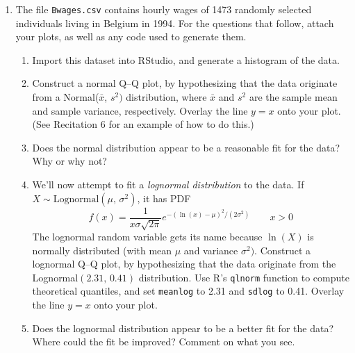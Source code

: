 \documentclass{article}    %
\begin{document}
\begin{enumerate}
		\item The file \texttt{Bwages.csv} contains hourly wages of 1473 randomly selected individuals living in Belgium in 1994. For the questions that follow, attach your plots, as well as any code used to generate them.
		
		\begin{enumerate}
			\item Import this dataset into RStudio, and generate a histogram of the data. 
			
			\item  Construct a normal Q--Q plot, by hypothesizing
			that the data originate from a Normal($\bar x$, $s^2)$ distribution,
			where $\bar x$ and $s^2$ are the sample mean and sample variance,
			respectively. Overlay the line $y=x$ onto your plot.  (See
			Recitation 6 for an example of how to do this.) 		
			
			\item Does the normal distribution appear to be a reasonable fit for the data? Why or why not? 
			

			\item  We'll now attempt to fit a \textit{lognormal distribution} to the data. If $X \sim \text{Lognormal}(\mu, \, \sigma^2)$, it has PDF
			$$
			f(x) =\frac{1}{x\sigma\sqrt{2\pi}}e^{-(\ln(x) - \mu)^2/(2\sigma^2)} \qquad x > 0
			$$
			The lognormal random variable gets its name because $\ln(X)$ is normally distributed (with mean $\mu$ and variance $\sigma^2)$. Construct a lognormal Q--Q plot, by hypothesizing that the data originate from the Lognormal$(2.31, \, 0.41)$ distribution. Use R's \texttt{qlnorm} function to compute theoretical quantiles, and set \texttt{meanlog} to 2.31 and \texttt{sdlog} to 0.41. Overlay the line $y=x$ onto your plot.
			
			\item Does the lognormal distribution appear to be a better fit for the data? Where could the fit be improved? Comment on what you see. 
			
		\end{enumerate}		
	\end{enumerate}
	
\end{document}
